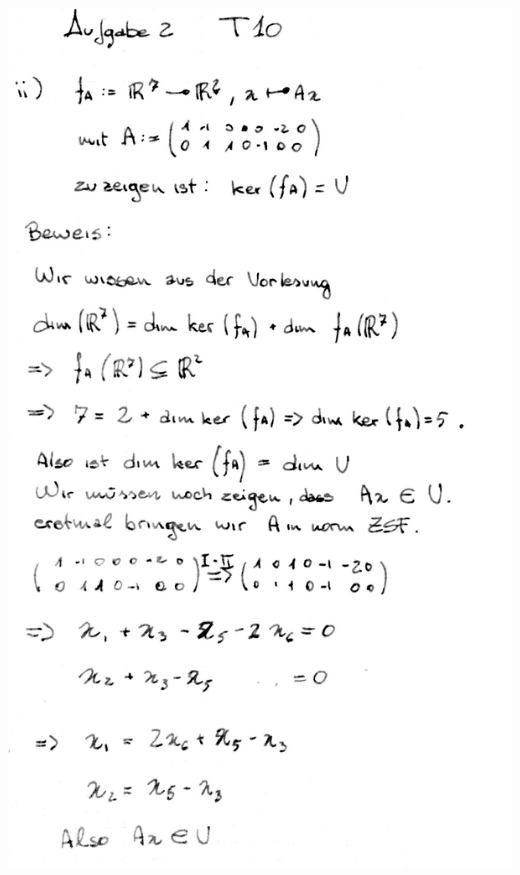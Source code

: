 \documentclass[10pt,a4paper]{article}
\begin{document}
\includegraphics[scale=0.25]{lat1_4.jpg}  \\
\end{document}
